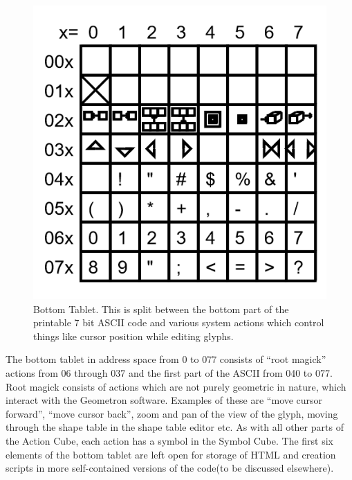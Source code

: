 \documentclass[11pt]{article}
\begin{document}
\begin{figure}
\includegraphics[width=\linewidth]{figures/figure3_bottomTablet.png}

\caption{Bottom Tablet.  This is split between the bottom part of the printable 7 bit ASCII code and various system actions which control things like cursor position while editing glyphs. }
\end{figure}

    The bottom tablet in address space from 0 to 077 consists of ``root magick'' actions from 06 through 037 and the first part of the ASCII from 040 to 077.  Root magick consists of actions which are not purely geometric in nature, which interact with the Geometron software.  Examples of these are ``move cursor forward'', ``move cursor back'', zoom and pan of the view of the glyph, moving through the shape table in the shape table editor etc.  As with all other parts of the Action Cube, each action has a symbol in the Symbol Cube.  The first six elements of the bottom tablet are left open for storage of HTML and creation scripts in more self-contained versions of the code(to be discussed elsewhere).  
\end{document}
